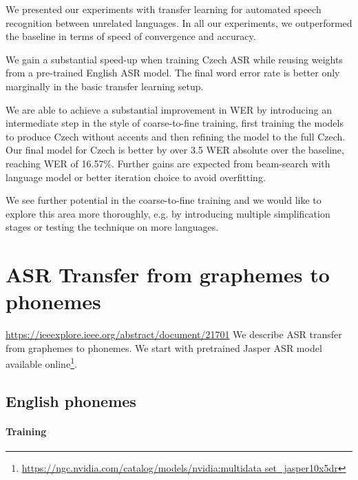 We presented our experiments with transfer learning for automated speech recognition between unrelated languages.
In all our experiments, we outperformed the baseline in terms of speed of convergence and accuracy.

We gain a substantial speed-up when training Czech ASR while reusing weights from a pre-trained English ASR model. The final word error rate is better only marginally in the basic transfer learning setup.

We are able to achieve a substantial improvement in WER by introducing an intermediate step in the style of coarse-to-fine training, first training the models to produce Czech without accents and then refining the model to the full Czech.
Our final model for Czech is better by over 3.5 WER absolute over the baseline, reaching WER of 16.57\%. Further gains are expected from beam-search with language model or better iteration choice to avoid overfitting.


We see further potential in the coarse-to-fine training and we would like to explore this area more thoroughly, e.g. by introducing multiple simplification stages or testing the technique on more languages.


\section{ASR Transfer from graphemes to phonemes}
\label{asr:transfer_phonemes}
\url{https://ieeexplore.ieee.org/abstract/document/21701}
We describe ASR transfer from graphemes to phonemes. We start with pretrained Jasper ASR model available online\footnote{\url{https://ngc.nvidia.com/catalog/models/nvidia:multidata set_jasper10x5dr}}.



\subsection{English phonemes}
\paragraph{Training}

